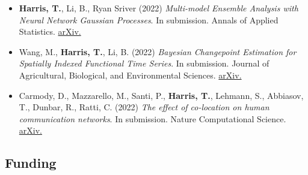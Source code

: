 \documentclass[11pt]{article}
\begin{document}
\begin{itemize}[leftmargin=*,label={}]
    \setlength\itemsep{0.5em}
    
    \item \textbf{Harris, T.}, Li, B., Ryan Sriver (2022) \textit{Multi-model Ensemble Analysis with Neural Network Gaussian Processes}. In submission. Annals of Applied Statistics. \href{https://arxiv.org/pdf/2202.04152.pdf}{\color{blue} {arXiv.}}

    \item Wang, M., \textbf{Harris, T.}, Li, B. (2022) \textit{Bayesian Changepoint Estimation for Spatially Indexed Functional Time Series}. In submission. Journal of Agricultural, Biological, and Environmental Sciences. \href{https://arxiv.org/pdf/2201.02742.pdf}{\color{blue} {arXiv.}}

    \item Carmody, D., Mazzarello, M., Santi, P., \textbf{Harris, T.}, Lehmann, S., Abbiasov, T., Dunbar, R., Ratti, C. (2022) \textit{The effect of co-location on human communication networks}. In submission. Nature Computational Science. \href{https://arxiv.org/pdf/2201.02230.pdf}{\color{blue} {arXiv.}} \end{itemize}   


%
%    
%
%    
%    


\subsection*{Funding}
\vspace{-0.6cm}\noindent\hrulefill
\vspace{0.2cm}
\end{document}
